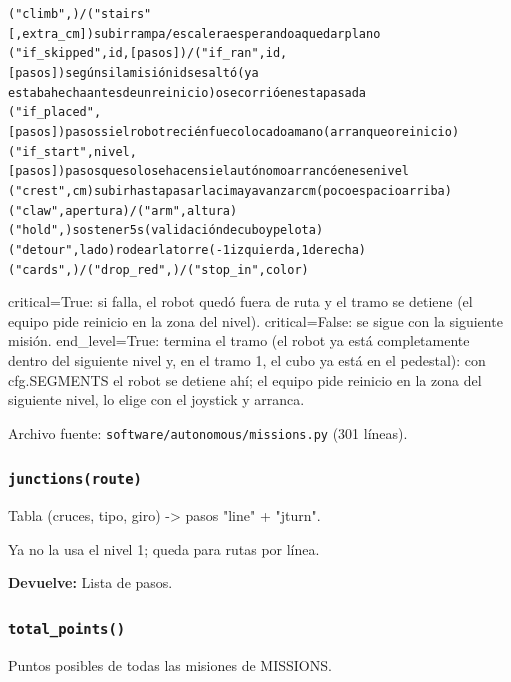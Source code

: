 {\small\begin{alltt}
("climb",) / ("stairs"[, extra\_cm])   subir rampa / escalera esperando a quedar plano
("if\_skipped", id, [pasos]) / ("if\_ran", id, [pasos])  según si la misión id se saltó (ya
                           estaba hecha antes de un reinicio) o se corrió en esta pasada
("if\_placed", [pasos])       pasos si el robot recién fue colocado a mano (arranque o reinicio)
("if\_start", nivel, [pasos])  pasos que solo se hacen si el autónomo arrancó en ese nivel
("crest", cm)              subir hasta pasar la cima y avanzar cm (poco espacio arriba)
("claw", apertura) / ("arm", altura)
("hold",)                  sostener 5 s (validación de cubo y pelota)
("detour", lado)           rodear la torre (-1 izquierda, 1 derecha)
("cards",) / ("drop\_red",) / ("stop\_in", color)
\end{alltt}}
critical=True: si falla, el robot quedó fuera de ruta y el tramo se detiene (el equipo pide reinicio en la zona del nivel). critical=False: se sigue con la siguiente misión. end\_level=True: termina el tramo (el robot ya está completamente dentro del siguiente nivel y, en el tramo 1, el cubo ya está en el pedestal): con cfg.SEGMENTS el robot se detiene ahí; el equipo pide reinicio en la zona del siguiente nivel, lo elige con el joystick y arranca.

\noindent Archivo fuente: \texttt{software/autonomous/missions.py} (301 l\'ineas).

\subsubsection{\texttt{junctions(route)}}\label{fn:missions:junctions}
\noindent Tabla (cruces, tipo, giro) -> pasos "line" + "jturn".

Ya no la usa el nivel 1; queda para rutas por línea.

\par{}\par\smallskip
\noindent\textbf{Devuelve:} Lista de pasos.\par

\subsubsection{\texttt{total\_\allowbreak{}points()}}\label{fn:missions:total-points}
\noindent Puntos posibles de todas las misiones de MISSIONS.

